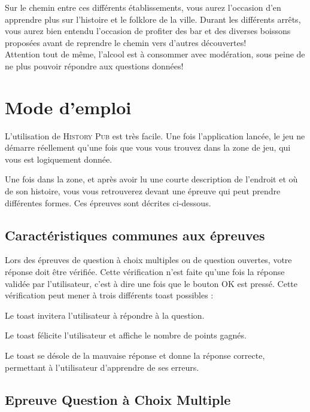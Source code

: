 \documentclass[11pt]{scrreprt}
\begin{document}
    Sur le chemin entre ces différents établissements, vous aurez l'occasion d'en apprendre plus sur l'histoire et le folklore de la ville. Durant les différents arrêts, vous aurez bien entendu l'occasion de profiter des bar et des diverses boissons proposées avant de reprendre le chemin vers d'autres découvertes!\\

    Attention tout de même, l'alcool est à consommer avec modération, sous peine de ne plus pouvoir répondre aux questions données!

    \chapter{Mode d'emploi}
    L'utilisation de \textsc{History Pub} est très facile. Une fois l'application lancée, le jeu ne démarre réellement qu'une fois que vous vous trouvez dans la zone de jeu, qui vous est logiquement donnée.


    Une fois dans la zone, et après avoir lu une courte description de l'endroit et où de son histoire, vous vous retrouverez devant une épreuve qui peut prendre différentes formes. Ces épreuves sont décrites ci-dessous.

    \section{Caractéristiques communes aux épreuves}
    Lors des épreuves de question à choix multiples ou de question ouvertes, votre réponse doit être vérifiée. Cette vérification n'est faite qu'une fois la réponse validée par l'utilisateur, c'est à dire une fois que le bouton OK est pressé. Cette vérification peut mener à trois différents toast possibles :
    \begin{description}[style=nextline]
        \item[Pas de réponse donnée]Le toast invitera l'utilisateur à répondre à la question.
        \item[Réponse correcte] Le toast félicite l'utilisateur et affiche le nombre de points gagnés.
        \item[Réponse incorrecte] Le toast se désole de la mauvaise réponse et donne la réponse correcte, permettant à l'utilisateur d'apprendre de ses erreurs.
    \end{description}

    \section{Epreuve Question à Choix Multiple}
\end{document}
